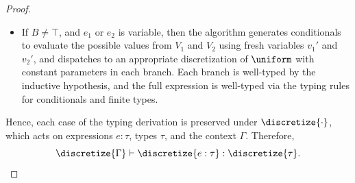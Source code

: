 \begin{proof}
\begin{itemize}
        \item If $B \neq \top$, and $e_1$ or $e_2$ is variable, then the algorithm generates conditionals to evaluate the possible values from $V_1$ and $V_2$ using fresh variables $v_1'$ and $v_2'$, and dispatches to an appropriate discretization of $\uniform$ with constant parameters in each branch. Each branch is well-typed by the inductive hypothesis, and the full expression is well-typed via the typing rules for conditionals and finite types.
    \end{itemize}



    Hence, each case of the typing derivation is preserved under $\discretize{\cdot}$, which acts on expressions $e : \tau$, types $\tau$, and the context $\Gamma$. Therefore,
    \[
    \discretize{\Gamma} \vdash \discretize{e : \tau} : \discretize{\tau}.
    \]

\end{proof}


